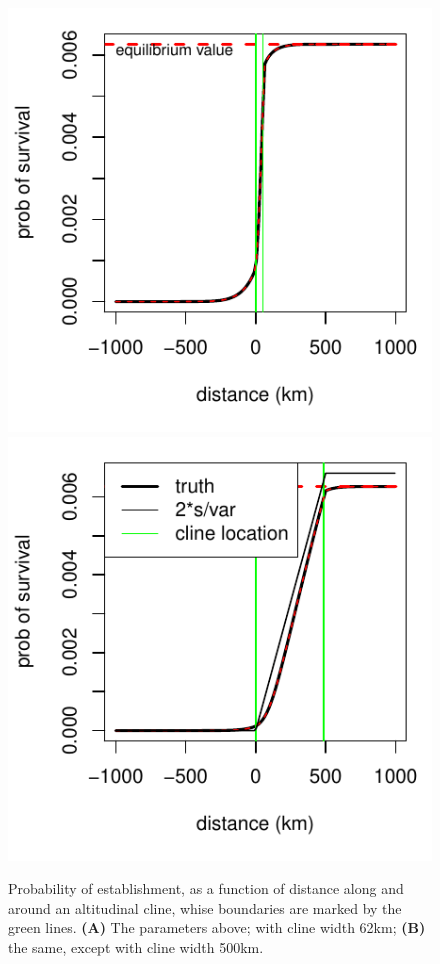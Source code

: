 \begin{figure}[ht!!]
  \begin{center}
    \includegraphics{prob-estab-62}
    \includegraphics{prob-estab-500}
  \end{center}
  \caption{
  Probability of establishment, as a function of distance along and around an altitudinal cline, whise boundaries are marked by the green lines.
  {\bf (A)} The parameters above; with cline width 62km; {\bf (B)} the same, except with cline width 500km.
  \label{sfig:prob_estab}
  }
\end{figure}


